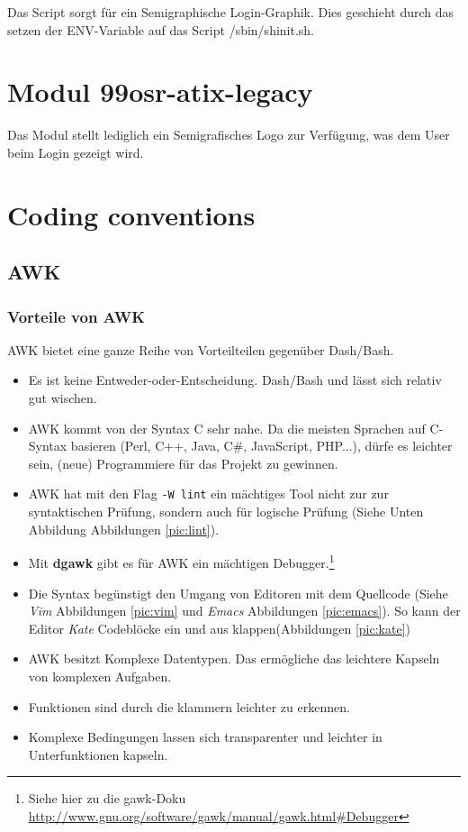 \documentclass[10pt,a4paper]{article}
\begin{document}
Das Script sorgt für ein Semigraphische Login-Graphik. Dies geschieht durch das setzen der ENV-Variable auf das Script /sbin/shinit.sh.

\section{Modul 99osr-atix-legacy}

Das Modul stellt lediglich ein Semigrafisches Logo zur Verfügung, was dem User beim Login gezeigt wird.

\section{Coding conventions}

\subsection{AWK}

\subsubsection{Vorteile von AWK}

AWK bietet eine ganze Reihe von Vorteilteilen gegenüber Dash/Bash.

\begin{itemize}
 \item Es ist keine Entweder-oder-Entscheidung. Dash/Bash und lässt sich relativ gut wischen.
 \item AWK kommt von der Syntax C sehr nahe. Da die meisten Sprachen auf C-Syntax
       basieren (Perl, C++, Java, C\#, JavaScript, PHP...), dürfe es leichter sein,
       (neue) Programmiere für das Projekt zu gewinnen.
 \item AWK hat mit den Flag \verb|-W lint|  ein mächtiges Tool nicht zur
       zur syntaktischen Prüfung, sondern auch für logische Prüfung (Siehe Unten
       Abbildung Abbildungen \ref{pic:lint}).
 \item Mit \textbf{dgawk} gibt es für AWK ein mächtigen Debugger.\footnote{Siehe
       hier zu die gawk-Doku \url{http://www.gnu.org/software/gawk/manual/gawk.html\#Debugger}}
 \item Die Syntax begünstigt den Umgang von Editoren mit dem Quellcode (Siehe \textit{Vim}
       Abbildungen \ref{pic:vim} und \textit{Emacs} Abbildungen \ref{pic:emacs}). So kann
       der Editor \textit{Kate} Codeblöcke ein und aus klappen(Abbildungen \ref{pic:kate})
 \item AWK besitzt Komplexe Datentypen. Das ermögliche das leichtere Kapseln von
       komplexen Aufgaben.
 \item Funktionen sind durch die klammern leichter zu erkennen.
 \item Komplexe Bedingungen lassen sich transparenter und leichter in Unterfunktionen
       kapseln.
\end{itemize}
\end{document}
